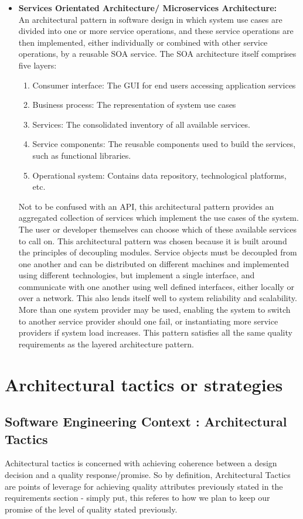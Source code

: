 \documentclass[a4paper,10pt]{article}
\begin{document}
\begin{itemize}
		\item \textbf{Services Orientated Architecture/ Microservices Architecture:}\\
		An architectural pattern in software design in which system use cases are divided into one or more service operations, and these service operations are then implemented, either individually or combined with other service operations, by a reusable SOA service. The SOA architecture itself comprises five layers:
		\begin{enumerate}
			\item Consumer interface: The GUI for end users accessing application services
			\item Business process: The representation of system use cases
			\item Services: The consolidated inventory of all available services.
			\item Service components: The reusable components used to build the services, such as functional libraries.
			\item Operational system: Contains data repository, technological platforms, etc.
		\end{enumerate}
		Not to be confused with an API, this architectural pattern provides an aggregated collection of services which implement the use cases of the system. The user or developer themselves can choose which of these available services to call on. This architectural pattern was chosen because it is built around the principles of decoupling modules. Service objects must be decoupled from one another and can be distributed on different machines and implemented using different technologies, but implement a single interface, and communicate with one another using well defined interfaces, either locally or over a network. This also lends itself well to system reliability and scalability. More than one system provider may be used, enabling the system to switch to another service provider should one fail, or instantiating more service providers if system load increases. This pattern satisfies all the same quality requirements as the layered architecture pattern.
	\end{itemize}

\section{Architectural tactics or strategies}
\subsection{Software Engineering Context : Architectural Tactics}
Achitectural tactics is concerned with achieving coherence between  a design decision and a quality response/promise. So by definition, Architectural Tactics are points of leverage for achieving quality attributes previously stated in the requirements section - simply put, this referes to how we plan to keep our promise of the level of quality stated previously. 
\end{document}
